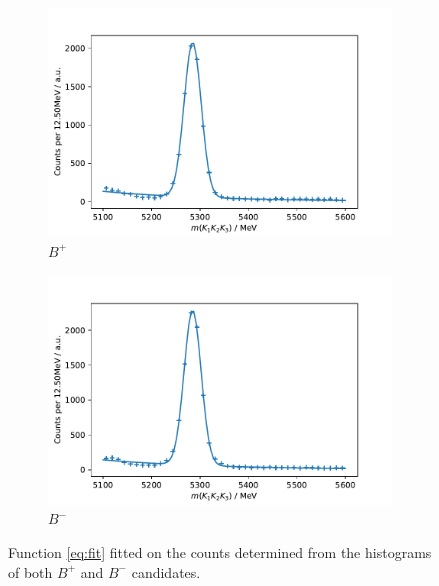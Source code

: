 \begin{figure}[H]
	\centering
	\begin{subfigure}{0.45\textwidth}
		\includegraphics[width=\textwidth]{content/pictures/image_fin/invmassFitBN.pdf}
		\caption{$B^+$}
	\end{subfigure}
	\begin{subfigure}{0.45\textwidth}
		\includegraphics[width=\textwidth]{content/pictures/image_fin/invmassFitBP.pdf}
		\caption{$B^-$}
	\end{subfigure} 
	\caption{Function \autoref{eq:fit} fitted on the counts determined from the histograms of both $B^+$ and $B^-$ candidates.}
	\label{fig:fits}
\end{figure}


